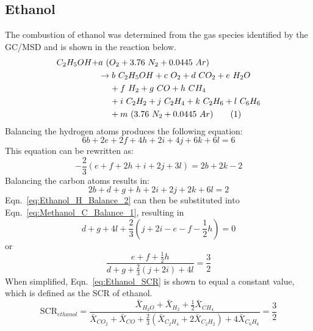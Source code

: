 \documentclass[12pt]{article}
\newcommand\numberthis{\addtocounter{equation}{1}\tag{\theequation}}
\begin{document}
\subsection{Ethanol}
\label{ssec:Ethanol_SCR}
The combustion of ethanol was determined from the gas species identified by the GC/MSD and is shown in the reaction below.
\begin{align*}
C_{2}H_{5}OH+&a~(O_{2}+3.76~N_{2}+0.0445~Ar)\\
&\rightarrow b~C_{2}H_{5}OH+c~O_{2}+ d~CO_{2}+e~H_{2}O\\
&~~~~+f~H_{2}+ g~CO+h~CH_{4}\\
&~~~~ +i~C_{2}H_{2}+j~C_{2}H_{4}+k~C_{2}H_{6}+l~C_{6}H_{6}\\
&~~~~+m~(3.76~N_{2}+0.0445~Ar) \numberthis \label{eq:Ethanol_rxn}
\end{align*}
Balancing the hydrogen atoms produces the following equation:
\begin{equation}
\label{eq:Ethanol_H_Balance_1}
6b+2e+2f+4h+2i+4j+6k+6l=6
\end{equation}
This equation can be rewritten as:
\begin{equation}
\label{eq:Ethanol_H_Balance_2}
-\frac{2}{3}\left(e+f+2h+i+2j+3l\right)=2b+2k-2
\end{equation}
Balancing the carbon atoms results in:
\begin{equation}
\label{eq:Ethanol_C_Balance_1}
2b+d+g+h+2i+2j+2k+6l=2
\end{equation}
Eqn.~\ref{eq:Ethanol_H_Balance_2} can then be substituted into Eqn.~\ref{eq:Methanol_C_Balance_1}, resulting in
\begin{equation}
\label{eq:Ethanol_C_Balance_2}
d+g+4l+\frac{2}{3}\left(j+2i-e-f-\frac{1}{2}h\right)=0
\end{equation}
or 
\begin{equation}
\label{eq:Ethanol_SCR}
\frac{e+f+\frac{1}{2}h}{d+g+\frac{2}{3}(j+2i)+4l}=\frac{3}{2}
\end{equation}
When simplified, Eqn.~\ref{eq:Ethanol_SCR} is shown to equal a constant value, which is defined as the $\text{SCR}$ of ethanol.
\begin{equation}\label{eq:prod_ratio_ethanol}
\text{SCR}_{ethanol}=\frac{\bar{X}_{H_2O}+\bar{X}_{H_2}+\frac{1}{2}\bar{X}_{CH_4}}{\bar{X}_{CO_2}+\bar{X}_{CO}+\frac{2}{3}(\bar{X}_{C_2H_4}+2\bar{X}_{C_2H_2})+4\bar{X}_{C_6H_6}}=\frac{3}{2}
\end{equation}

\pagebreak
\end{document}
